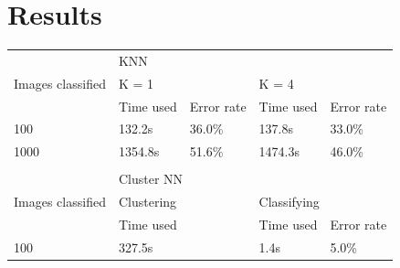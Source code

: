 \documentclass{article}
\begin{document}
\newpage

\section{Results}
\begin{table}[]
\centering
\begin{tabular}{lllll}
\hline
\multicolumn{1}{|l|}{\multirow{3}{*}{Images classified}} & \multicolumn{4}{l|}{KNN}                                                                                                            \\ \cline{2-5} 
\multicolumn{1}{|l|}{}                                   & \multicolumn{2}{l|}{K = 1}                                       & \multicolumn{2}{l|}{K = 4}                                       \\ \cline{2-5} 
\multicolumn{1}{|l|}{}                                   & \multicolumn{1}{l|}{Time used} & \multicolumn{1}{l|}{Error rate} & \multicolumn{1}{l|}{Time used} & \multicolumn{1}{l|}{Error rate} \\ \hline
\multicolumn{1}{|l|}{100}                                & \multicolumn{1}{l|}{132.2s}    & \multicolumn{1}{l|}{36.0\%}     & \multicolumn{1}{l|}{137.8s}    & \multicolumn{1}{l|}{33.0\%}     \\ \hline
\multicolumn{1}{|l|}{1000}                               & \multicolumn{1}{l|}{1354.8s}   & \multicolumn{1}{l|}{51.6\%}     & \multicolumn{1}{l|}{1474.3s}   & \multicolumn{1}{l|}{46.0\%}     \\ \hline
                                                         &                                &                                 &                                &                                 \\ \hline
\multicolumn{1}{|l|}{\multirow{3}{*}{Images classified}} & \multicolumn{4}{l|}{Cluster NN}                                                                                                     \\ \cline{2-5} 
\multicolumn{1}{|l|}{}                                   & \multicolumn{2}{l|}{Clustering}                                  & \multicolumn{2}{l|}{Classifying}                                 \\ \cline{2-5} 
\multicolumn{1}{|l|}{}                                   & \multicolumn{2}{l|}{Time used}                                   & \multicolumn{1}{l|}{Time used} & \multicolumn{1}{l|}{Error rate} \\ \hline
\multicolumn{1}{|l|}{100}                                & \multicolumn{2}{l|}{327.5s}                                      & \multicolumn{1}{l|}{1.4s}      & \multicolumn{1}{l|}{5.0\%}      \\ \hline

\end{tabular}
\end{table}
\end{document}

